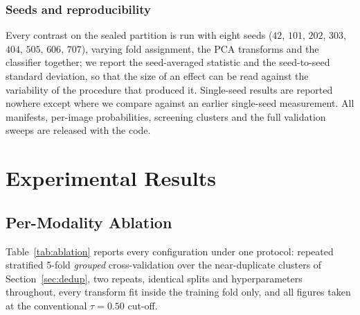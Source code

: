 \documentclass[journal]{IEEEtran}
\begin{document}
\subsubsection{Seeds and reproducibility}
Every contrast on the sealed partition is run with eight seeds
($42$, $101$, $202$, $303$, $404$, $505$, $606$, $707$), varying fold
assignment, the PCA transforms and the classifier together; we report the
seed-averaged statistic and the seed-to-seed standard deviation, so that the
size of an effect can be read against the variability of the procedure that
produced it. Single-seed results are reported nowhere except where we compare
against an earlier single-seed measurement. All manifests, per-image
probabilities, screening clusters and the full validation sweeps are released
with the code.


%
%

\section{Experimental Results}

\subsection{Per-Modality Ablation}
\label{sec:ablation}

Table~\ref{tab:ablation} reports every configuration under one protocol:
repeated stratified 5-fold \emph{grouped} cross-validation over the
near-duplicate clusters of Section~\ref{sec:dedup}, two repeats, identical
splits and hyperparameters throughout, every transform fit inside the training
fold only, and all figures taken at the conventional $\tau = 0.50$ cut-off.
\end{document}
